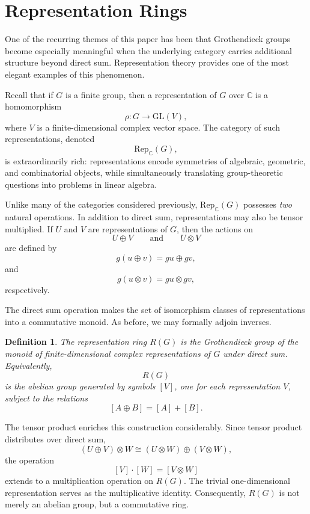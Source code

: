 \documentclass[12pt,reqno]{amsart}
\theoremstyle{plain}
\newtheorem{defn}[thm]{Definition}
\numberwithin{equation}{section}
\begin{document}
\section{Representation Rings}

One of the recurring themes of this paper has been that Grothendieck groups become especially meaningful when the underlying category carries additional structure beyond direct sum. Representation theory provides one of the most elegant examples of this phenomenon.

Recall that if $G$ is a finite group, then a representation of $G$ over $\mathbb C$ is a homomorphism
\[
\rho:G\to \mathrm{GL}(V),
\]
where $V$ is a finite-dimensional complex vector space. The category of such representations, denoted
\[
\mathrm{Rep}_{\mathbb C}(G),
\]
is extraordinarily rich: representations encode symmetries of algebraic, geometric, and combinatorial objects, while simultaneously translating group-theoretic questions into problems in linear algebra.

Unlike many of the categories considered previously, $\mathrm{Rep}_{\mathbb C}(G)$ possesses \emph{two} natural operations. In addition to direct sum, representations may also be tensor multiplied. If $U$ and $V$ are representations of $G$, then the actions on
\[
U\oplus V
\qquad\text{and}\qquad
U\otimes V
\]
are defined by
\[
g(u\oplus v)=gu\oplus gv,
\]
and
\[
g(u\otimes v)=gu\otimes gv,
\]
respectively.

The direct sum operation makes the set of isomorphism classes of representations into a commutative monoid. As before, we may formally adjoin inverses.

\begin{defn}
The \emph{representation ring} $R(G)$ is the Grothendieck group of the monoid of finite-dimensional complex representations of $G$ under direct sum. Equivalently,
\[
R(G)
\]
is the abelian group generated by symbols $[V]$, one for each representation $V$, subject to the relations
\[
[A\oplus B]=[A]+[B].
\]
\end{defn}

The tensor product enriches this construction considerably. Since tensor product distributes over direct sum,
\[
(U\oplus V)\otimes W
\cong
(U\otimes W)\oplus (V\otimes W),
\]
the operation
\[
[V]\cdot [W]=[V\otimes W]
\]
extends to a multiplication operation on $R(G)$. The trivial one-dimensional representation serves as the multiplicative identity. Consequently, $R(G)$ is not merely an abelian group, but a commutative ring.
\end{document}
